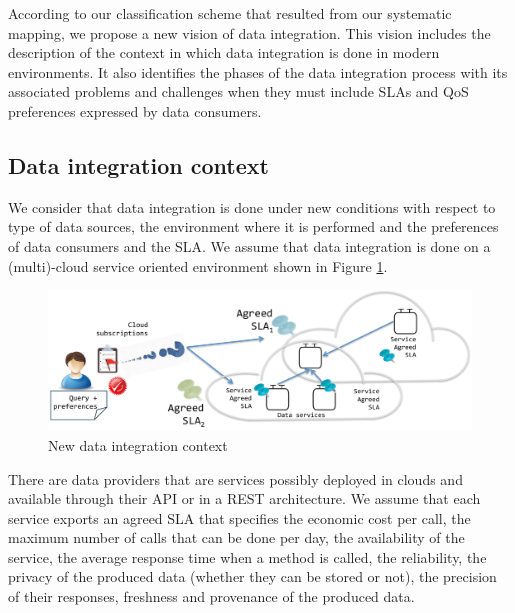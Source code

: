 
According to our classification scheme that resulted from our systematic mapping, we propose a new vision of data integration. This vision includes the description of the context in which data integration is done in modern environments. It also identifies the phases of the data integration process with its associated problems and challenges when they must include SLAs and QoS preferences expressed by data consumers. 


\subsection{Data integration context}
We consider that data integration is done under new conditions with respect to type of data sources, the environment where it is performed and the preferences  of data consumers and the SLA. We assume that data integration is done on a (multi)-cloud service oriented environment shown in Figure \ref{fig:vision}. 
\begin{figure}[h!]
\centering
\includegraphics[scale=0.50]{figs/DataIntegrationContext.pdf} 
\caption{New data integration context}\label{fig:vision}
\end{figure}

There are data providers that are services possibly deployed in clouds and available  through their API or in a REST architecture. We assume that  each service exports an agreed SLA that specifies the economic cost per call, the maximum number of calls that can be done per day, the availability of the service, the average response time when a method is called, the reliability, the privacy of the produced data (whether they can be stored or not), the precision of their responses, freshness and provenance of the produced data.  



